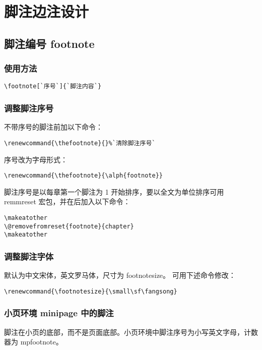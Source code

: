 \section{脚注边注设计}

\subsection{脚注编号 footnote}
\subsubsection{使用方法}
\begin{lstlisting}[language={[LaTeX]TeX}]
\footnote[`序号`]{`脚注内容`}
\end{lstlisting}

\subsubsection{调整脚注序号}
不带序号的脚注前加以下命令：
\begin{lstlisting}[language={[LaTeX]TeX}]
\renewcommand{\thefootnote}{}%`清除脚注序号`
\end{lstlisting}
序号改为字母形式：
\begin{lstlisting}[language={[LaTeX]TeX}]
\renewcommand{\thefootnote}{\alph{footnote}}
\end{lstlisting}
脚注序号是以每章第一个脚注为 1 开始排序，要以全文为单位排序可用
remmreset 宏包，并在后加入以下命令：
\begin{lstlisting}[language={[LaTeX]TeX}]
\makeatother
\@removefromreset{footnote}{chapter}
\makeatother
\end{lstlisting}
\subsubsection{调整脚注字体}
默认为中文宋体，英文罗马体，尺寸为 footnotesize。
可用下述命令修改：
\begin{lstlisting}[language={[LaTeX]TeX}]
\renewcommand{\footnotesize}{\small\sf\fangsong}
\end{lstlisting}

\subsubsection{小页环境 minipage 中的脚注}
脚注在小页的底部，而不是页面底部。小页环境中脚注序号为小写英文字母，计数器为 mpfootnote。

